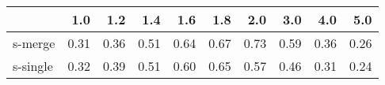 \begin{tabular}{lrrrrrrrrr}
\toprule
{} &  1.0 &  1.2 &  1.4 &  1.6 &  1.8 &  2.0 &  3.0 &  4.0 &  5.0 \\
\midrule
s-merge  & 0.31 & 0.36 & 0.51 & 0.64 & 0.67 & 0.73 & 0.59 & 0.36 & 0.26 \\
s-single & 0.32 & 0.39 & 0.51 & 0.60 & 0.65 & 0.57 & 0.46 & 0.31 & 0.24 \\
\bottomrule
\end{tabular}
